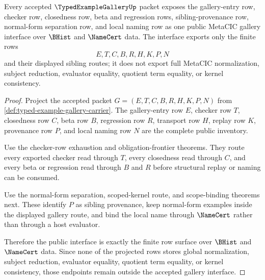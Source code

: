 \begin{theorem}
\label{thm:typedexamplegallery-public-interface}
Every accepted $\TypedExampleGalleryUp$ packet exposes the gallery-entry row, checker row, closedness row, beta and regression rows, sibling-provenance row, normal-form separation row, and local naming row as one public MetaCIC gallery interface over $\BHist$ and $\NameCert$ data. The interface exports only the finite rows
$$
E,T,C,B,R,H,K,P,N
$$
and their displayed sibling routes; it does not export full MetaCIC normalization, subject reduction, evaluator equality, quotient term equality, or kernel consistency.
\end{theorem}
\begin{proof}
Project the accepted packet $G=(E,T,C,B,R,H,K,P,N)$ from \autoref{def:typed-example-gallery-carrier}. The gallery-entry row $E$, checker row $T$, closedness row $C$, beta row $B$, regression row $R$, transport row $H$, replay row $K$, provenance row $P$, and local naming row $N$ are the complete public inventory.

Use the checker-row exhaustion and obligation-frontier theorems. They route every exported checker read through $T$, every closedness read through $C$, and every beta or regression read through $B$ and $R$ before structural replay or naming can be consumed.

Use the normal-form separation, scoped-kernel route, and scope-binding theorems next. These identify $P$ as sibling provenance, keep normal-form examples inside the displayed gallery route, and bind the local name through $\NameCert$ rather than through a host evaluator.

Therefore the public interface is exactly the finite row surface over $\BHist$ and $\NameCert$ data. Since none of the projected rows stores global normalization, subject reduction, evaluator equality, quotient term equality, or kernel consistency, those endpoints remain outside the accepted gallery interface.
\end{proof}

